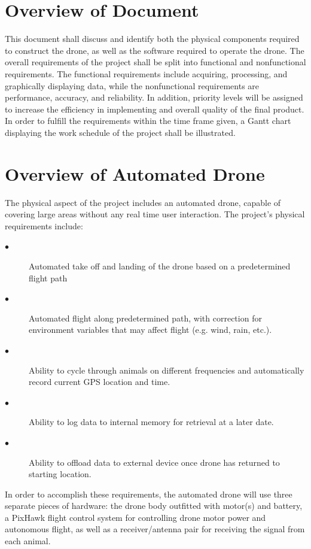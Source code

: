 \documentclass[onecolumn, draftclsnofoot,10pt, compsoc]{IEEEtran}
\begin{document}
\section{Overview of Document}
This document shall discuss and identify both the physical components required to construct the drone, as well as the software required to operate the drone. The overall requirements of the project shall be split into functional and nonfunctional requirements. The functional requirements include acquiring, processing, and graphically displaying data, while the nonfunctional requirements are performance, accuracy, and reliability. In addition, priority levels will be assigned to increase the efficiency in implementing and overall quality of the final product. In order to fulfill the requirements within the time frame given, a Gantt chart displaying the work schedule of the project shall be illustrated.

\section{Overview of Automated Drone}
The physical aspect of the project includes an automated drone, capable of covering large areas without any real time user interaction. The project’s physical requirements include:

\begin{description}
\item[$\bullet$] Automated take off and landing of the drone based on a predetermined flight path
\item[$\bullet$] Automated flight along predetermined path, with correction for environment variables that may affect flight (e.g. wind, rain, etc.).
\item[$\bullet$] Ability to cycle through animals on different frequencies and automatically record current GPS location and time.
\item[$\bullet$] Ability to log data to internal memory for retrieval at a later date.
\item[$\bullet$] Ability to offload data to external device once drone has returned to starting location.
\end{description}

In order to accomplish these requirements, the automated drone will use three separate pieces of hardware: the drone body outfitted with motor(s) and battery, a PixHawk flight control system for controlling drone motor power and autonomous flight, as well as a receiver/antenna pair for receiving the signal from each animal.
\end{document}
